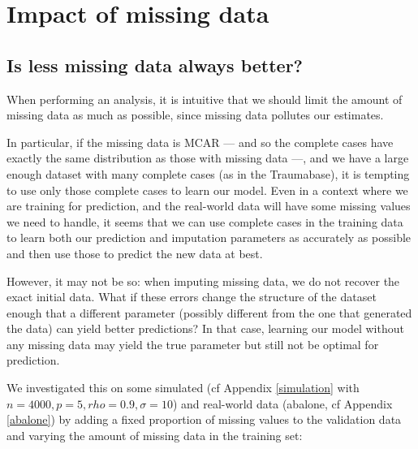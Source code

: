 	\section{Impact of missing data}
		\subsection{Is less missing data always better?}
	\label{miss_impact}
When performing an analysis, it is intuitive that we should limit the amount of missing data as much as possible, since missing data pollutes our estimates.

In particular, if the missing data is MCAR --- and so the complete cases have exactly the same distribution as those with missing data ---, and we have a large enough dataset with many complete cases (as in the Traumabase), it is tempting to use only those complete cases to learn our model. Even in a context where we are training for prediction, and the real-world data will have some missing values we need to handle, it seems that we can use complete cases in the training data to learn both our prediction and imputation parameters as accurately as possible and then use those to predict the new data at best.

However, it may not be so: when imputing missing data, we do not recover the exact initial data. What if these errors change the structure of the dataset enough that a different parameter (possibly different from the one that generated the data) can yield better predictions? In that case, learning our model without any missing data may yield the true parameter but still not be optimal for prediction.

We investigated this on some simulated (cf Appendix \ref{simulation} with $n=4000, p=5, rho=0.9, \sigma=10$) and real-world data (abalone, cf Appendix \ref{abalone}) by adding a fixed proportion of missing values to the validation data and varying the amount of missing data in the training set:

